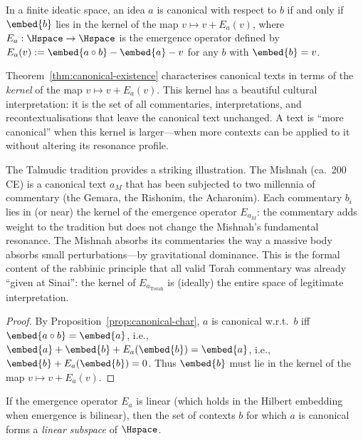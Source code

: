 \begin{theorem}
\label{thm:canonical-existence}
In a finite ideatic space, an idea $a$ is canonical with respect to $b$ if
and only if $\embed{b}$ lies in the kernel of the map
$v \mapsto v + E_a(v)$, where $E_a : \Hspace \to \Hspace$ is the
emergence operator defined by $E_a(v) := \embed{a \compose b} - \embed{a} - v$
for any $b$ with $\embed{b} = v$.
\end{theorem}

\begin{interpretation}
\label{interp:ch10:canonical_kernel}
Theorem~\ref{thm:canonical-existence} characterises canonical texts in terms
of the \emph{kernel} of the map $v \mapsto v + E_a(v)$.  This kernel has a
beautiful cultural interpretation: it is the set of all commentaries,
interpretations, and recontextualisations that leave the canonical text
unchanged.  A text is ``more canonical'' when this kernel is larger---when
more contexts can be applied to it without altering its resonance profile.

The Talmudic tradition provides a striking illustration.  The Mishnah
(ca.\ 200 CE) is a canonical text $a_M$ that has been subjected to two
millennia of commentary (the Gemara, the Rishonim, the Acharonim).  Each
commentary $b_i$ lies in (or near) the kernel of the emergence operator
$E_{a_M}$: the commentary adds weight to the tradition but does not change
the Mishnah's fundamental resonance.  The Mishnah absorbs its commentaries
the way a massive body absorbs small perturbations---by gravitational
dominance.  This is the formal content of the rabbinic principle that all
valid Torah commentary was already ``given at Sinai'': the kernel of
$E_{a_{\mathrm{Torah}}}$ is (ideally) the entire space of legitimate
interpretation.
\end{interpretation}



\begin{proof}
By Proposition~\ref{prop:canonical-char}, $a$ is canonical w.r.t.\ $b$ iff
$\embed{a \compose b} = \embed{a}$, i.e.,
$\embed{a} + \embed{b} + E_a(\embed{b}) = \embed{a}$, i.e.,
$\embed{b} + E_a(\embed{b}) = 0$.  Thus $\embed{b}$ must lie in the kernel
of the map $v \mapsto v + E_a(v)$.
\end{proof}

\begin{corollary}
\label{cor:canonical-subspace}
If the emergence operator $E_a$ is linear (which holds in the Hilbert
embedding when emergence is bilinear), then the set of contexts $b$ for
which $a$ is canonical forms a \emph{linear subspace} of $\Hspace$.
\end{corollary}

